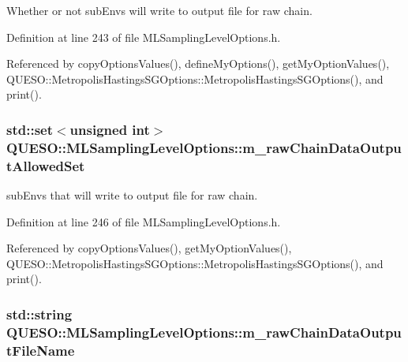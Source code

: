 Whether or not sub\-Envs will write to output file for raw chain. 



Definition at line 243 of file M\-L\-Sampling\-Level\-Options.\-h.



Referenced by copy\-Options\-Values(), define\-My\-Options(), get\-My\-Option\-Values(), Q\-U\-E\-S\-O\-::\-Metropolis\-Hastings\-S\-G\-Options\-::\-Metropolis\-Hastings\-S\-G\-Options(), and print().

\hypertarget{class_q_u_e_s_o_1_1_m_l_sampling_level_options_ae5c2fe5b90eda78e17ccfbf3dbcfcc89}{
\subsubsection[{m\-\_\-raw\-Chain\-Data\-Output\-Allowed\-Set}]{\setlength{\rightskip}{0pt plus 5cm}std\-::set$<$unsigned int$>$ Q\-U\-E\-S\-O\-::\-M\-L\-Sampling\-Level\-Options\-::m\-\_\-raw\-Chain\-Data\-Output\-Allowed\-Set}}\label{class_q_u_e_s_o_1_1_m_l_sampling_level_options_ae5c2fe5b90eda78e17ccfbf3dbcfcc89}


sub\-Envs that will write to output file for raw chain. 



Definition at line 246 of file M\-L\-Sampling\-Level\-Options.\-h.



Referenced by copy\-Options\-Values(), get\-My\-Option\-Values(), Q\-U\-E\-S\-O\-::\-Metropolis\-Hastings\-S\-G\-Options\-::\-Metropolis\-Hastings\-S\-G\-Options(), and print().

\hypertarget{class_q_u_e_s_o_1_1_m_l_sampling_level_options_ab89d7ed301a956f913058a8e5f63fbbd}{
\subsubsection[{m\-\_\-raw\-Chain\-Data\-Output\-File\-Name}]{\setlength{\rightskip}{0pt plus 5cm}std\-::string Q\-U\-E\-S\-O\-::\-M\-L\-Sampling\-Level\-Options\-::m\-\_\-raw\-Chain\-Data\-Output\-File\-Name}}\label{class_q_u_e_s_o_1_1_m_l_sampling_level_options_ab89d7ed301a956f913058a8e5f63fbbd}



